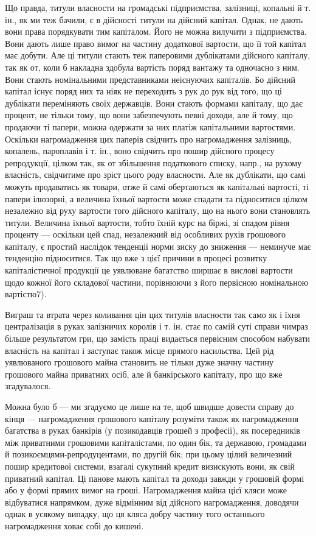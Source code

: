 Що правда, титули власности на громадські підприємства, залізниці,
копальні й т. ін., як ми теж бачили, є в дійсності титули на дійсний капітал.
Однак, не дають вони права порядкувати тим капіталом. Його не можна вилучити
з підприємства. Вони дають лише право вимог на частину додаткової вартости,
що її той капітал має добути. Але ці титули стають теж паперовими
дублікатами дійсного капіталу, так як от, коли б накладна здобула вартість
поряд вантажу та одночасно з ним. Вони стають номінальними представниками
неіснуючих капіталів. Бо дійсний капітал існує поряд них та ніяк не переходить
з рук до рук від того, що ці дублікати переміняють своїх державців. Вони стають
формами капіталу, що дає процент, не тільки тому, що вони забезпечують певні
доходи, але й тому, що продаючи ті папери, можна одержати за них платіж
капітальними вартостями. Оскільки нагромадження цих паперів свідчить про
нагромадження залізниць, копалень, пароплавів і т. ін., воно свідчить про пошир
дійсного процесу репродукції, цілком так, як от збільшення податкового списку,
напр., на рухому власність, свідчитиме про зріст цього роду власности. Але як
дублікати, що самі можуть продаватись як товари, отже й самі обертаються як
капітальні вартості, ті папери ілюзорні, а величина їхньої вартости може спадати
та підноситися цілком незалежно від руху вартости того дійсного капіталу, що
на нього вони становлять титули. Величина їхньої вартости, тобто їхній курс на
біржі, зі спадом рівня проценту — оскільки цей спад, незалежний від особливих
рухів грошового капіталу, є простий наслідок тенденції норми зиску до зниження
— неминуче має тенденцію підноситися. Так що вже з цієї причини
в процесі розвитку капіталістичної продукції це уявлюване багатство ширшає
в вислові вартости щодо кожної його складової частини, порівнюючи з його первісною
номінальною вартістю7).

Виграш та втрата через коливання цін цих титулів власности так само як
і їхня централізація в руках залізничих королів і т. ін. стає по самій суті справи
чимраз більше результатом гри, що замість праці видається первісним способом
набувати власність на капітал і заступає також місце прямого насильства. Цей рід
уявлюваного грошового майна становить не тільки дуже значну частину грошового
майна приватних осіб, але й банкірського капіталу, про що вже згадувалося.

Можна було б — ми згадуємо це лише на те, щоб швидше довести справу
до кінця — нагромадження грошового капіталу розуміти також як нагромадження
багатства в руках банкірів (у позикодавців грошей з професії), як посередників
між приватними грошовими капіталістами, по один бік, та державою, громадами
й позикоємцями-репродуцентами, по другій бік; при цьому цілий величезний
пошир кредитової системи, взагалі сукупний кредит визискують вони, як свій приватний
капітал. Ці панове мають капітал та доходи завжди у грошовій формі
або у формі прямих вимог на гроші. Нагромадження майна цієї кляси може
відбуватися напрямком, дуже відмінним від дійсного нагромадження, доводячи
однак в усякому випадку, що ця кляса добру частину того останнього нагромадження
ховає собі до кишені.


